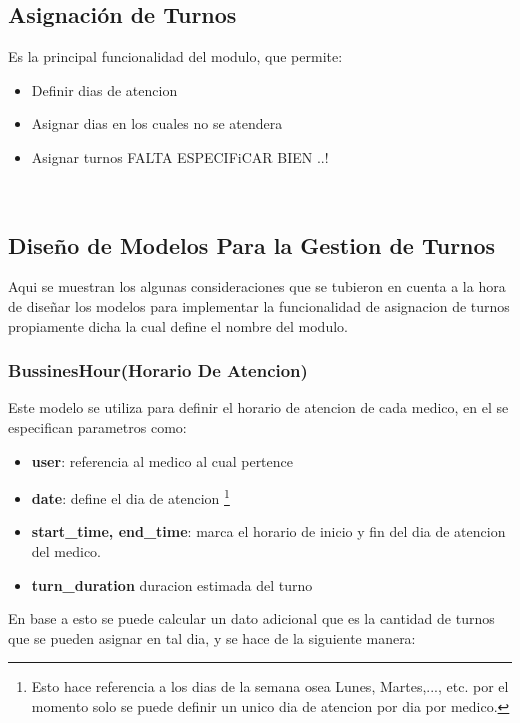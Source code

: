 \subsection{Asignaci\'on de Turnos}  

Es la principal funcionalidad del modulo, que permite:

\begin{itemize}
    \item Definir dias de atencion
    \item Asignar dias en los cuales no se atendera     
    \item Asignar turnos
    FALTA ESPECIFiCAR BIEN ..!
\end{itemize}


\\[0.5cm]

\subsection{Dise\~no de Modelos Para la Gestion de Turnos}

Aqui se muestran los algunas consideraciones que se tubieron en cuenta a la hora de 
dise\~nar los modelos para implementar la funcionalidad de asignacion de turnos
propiamente dicha la cual define el nombre del modulo. 

\subsubsection{BussinesHour(Horario De Atencion)}

Este modelo se utiliza para definir el horario de atencion de cada medico, en 
el se especifican parametros como:

\begin{itemize}
    \item \textbf{user}: referencia al medico al cual pertence 
    \item \textbf{date}: define el dia de atencion \footnote{Esto hace 
        referencia a los dias de la semana osea Lunes, Martes,..., etc. por el 
        momento solo se puede definir un unico dia de atencion por dia por 
    medico.}
    \item \textbf{start\_time, end\_time}: marca el horario de inicio y fin del 
        dia de atencion del medico.
    \item \textbf{turn\_duration} duracion estimada del turno
\end{itemize}

En base a esto se puede calcular un dato adicional que es la cantidad de turnos
que se pueden asignar en tal dia, y se hace de la siguiente manera:

